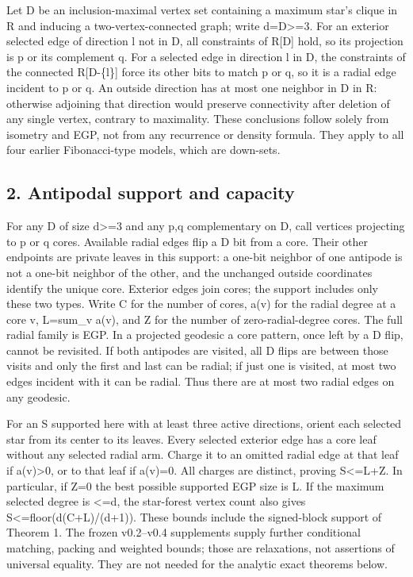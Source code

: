 \documentclass[
]{article}
\begin{document}
Let D be an inclusion-maximal vertex set containing a maximum star's
clique in R and inducing a two-vertex-connected graph; write
d=\textbar D\textbar\textgreater=3. For an exterior selected edge of
direction l not in D, all constraints of R{[}D{]} hold, so its
projection is p or its complement q. For a selected edge in direction l
in D, the constraints of the connected R{[}D-\{l\}{]} force its other
bits to match p or q, so it is a radial edge incident to p or q. An
outside direction has at most one neighbor in D in R: otherwise
adjoining that direction would preserve connectivity after deletion of
any single vertex, contrary to maximality. These conclusions follow
solely from isometry and EGP, not from any recurrence or density
formula. They apply to all four earlier Fibonacci-type models, which are
down-sets.

\subsection{2. Antipodal support and
capacity}\label{antipodal-support-and-capacity}

For any D of size d\textgreater=3 and any p,q complementary on D, call
vertices projecting to p or q cores. Available radial edges flip a D bit
from a core. Their other endpoints are private leaves in this support: a
one-bit neighbor of one antipode is not a one-bit neighbor of the other,
and the unchanged outside coordinates identify the unique core. Exterior
edges join cores; the support includes only these two types. Write C for
the number of cores, a(v) for the radial degree at a core v, L=sum\_v
a(v), and Z for the number of zero-radial-degree cores. The full radial
family is EGP. In a projected geodesic a core pattern, once left by a D
flip, cannot be revisited. If both antipodes are visited, all D flips
are between those visits and only the first and last can be radial; if
just one is visited, at most two edges incident with it can be radial.
Thus there are at most two radial edges on any geodesic.

For an S supported here with at least three active directions, orient
each selected star from its center to its leaves. Every selected
exterior edge has a core leaf without any selected radial arm. Charge it
to an omitted radial edge at that leaf if a(v)\textgreater0, or to that
leaf if a(v)=0. All charges are distinct, proving
\textbar S\textbar\textless=L+Z. In particular, if Z=0 the best possible
supported EGP size is L. If the maximum selected degree is \textless=d,
the star-forest vertex count also gives
\textbar S\textbar\textless=floor(d(C+L)/(d+1)). These bounds include
the signed-block support of Theorem 1. The frozen v0.2--v0.4 supplements
supply further conditional matching, packing and weighted bounds; those
are relaxations, not assertions of universal equality. They are not
needed for the analytic exact theorems below.
\end{document}
